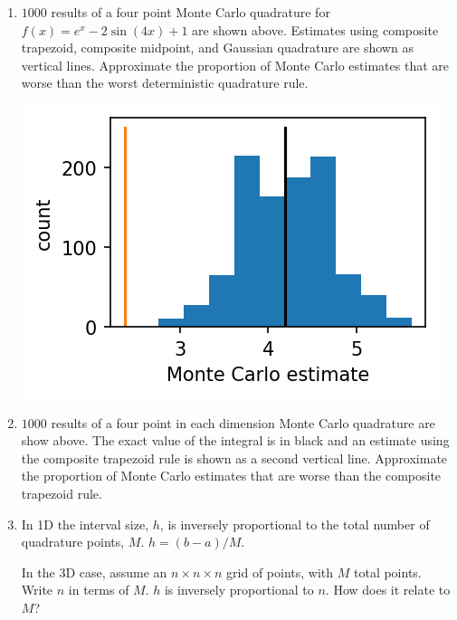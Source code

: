 \documentclass[12pt,letterpaper,noanswers]{exam}
\begin{document}
\begin{enumerate}
\item $1000$ results of a four point Monte Carlo quadrature for $f(x) = e^x - 2\sin(4x) + 1$ are shown above.  Estimates using composite trapezoid, composite midpoint, and Gaussian quadrature are shown as vertical lines.  Approximate the proportion of Monte Carlo estimates that are worse than the worst deterministic quadrature rule.
\vspace{1in}

\includegraphics{AM111-F23-CourseNotes/img/C16-MC64pts.png}
\item $1000$ results of a four point in each dimension Monte Carlo quadrature are show above.  The exact value of the integral is in black and an estimate using the composite trapezoid rule is shown as a second vertical line.  Approximate the proportion of Monte Carlo estimates that are worse than the composite trapezoid rule.
\vspace{1cm}

\item In 1D the interval size, $h$, is inversely proportional to the total number of quadrature points, $M$.  $h = (b-a)/M$.

In the 3D case, assume an $n\times n\times n$ grid of points, with $M$ total points.  Write $n$ in terms of $M$.  $h$ is inversely proportional to $n$.  How does it relate to $M$?

\vspace{1.5in}

\end{enumerate}

\end{document}

